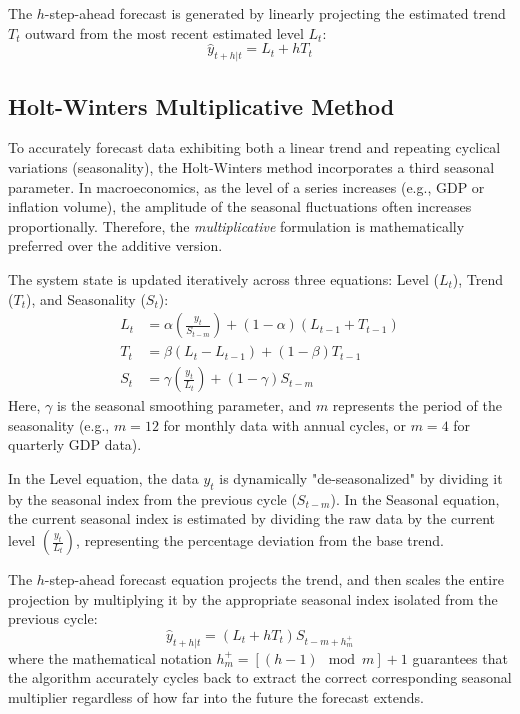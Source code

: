 \documentclass[11pt, a4paper]{report}
\begin{document}
The $h$-step-ahead forecast is generated by linearly projecting the estimated trend $T_t$ outward from the most recent estimated level $L_t$:
\begin{equation}
    \hat{y}_{t+h|t} = L_t + h T_t
\end{equation}

\subsection{Holt-Winters Multiplicative Method}
To accurately forecast data exhibiting both a linear trend and repeating cyclical variations (seasonality), the Holt-Winters method incorporates a third seasonal parameter. In macroeconomics, as the level of a series increases (e.g., GDP or inflation volume), the amplitude of the seasonal fluctuations often increases proportionally. Therefore, the \textit{multiplicative} formulation is mathematically preferred over the additive version.

The system state is updated iteratively across three equations: Level ($L_t$), Trend ($T_t$), and Seasonality ($S_t$):
\begin{align}
    L_t &= \alpha \left(\frac{y_t}{S_{t-m}}\right) + (1 - \alpha)(L_{t-1} + T_{t-1}) \\
    T_t &= \beta (L_t - L_{t-1}) + (1 - \beta)T_{t-1} \\
    S_t &= \gamma \left(\frac{y_t}{L_t}\right) + (1 - \gamma)S_{t-m}
\end{align}
Here, $\gamma$ is the seasonal smoothing parameter, and $m$ represents the period of the seasonality (e.g., $m=12$ for monthly data with annual cycles, or $m=4$ for quarterly GDP data). 

In the Level equation, the data $y_t$ is dynamically "de-seasonalized" by dividing it by the seasonal index from the previous cycle ($S_{t-m}$). In the Seasonal equation, the current seasonal index is estimated by dividing the raw data by the current level $\left(\frac{y_t}{L_t}\right)$, representing the percentage deviation from the base trend.

The $h$-step-ahead forecast equation projects the trend, and then scales the entire projection by multiplying it by the appropriate seasonal index isolated from the previous cycle:
\begin{equation}
    \hat{y}_{t+h|t} = (L_t + h T_t) S_{t-m+h_m^+}
\end{equation}
where the mathematical notation $h_m^+ = [(h-1) \mod m] + 1$ guarantees that the algorithm accurately cycles back to extract the correct corresponding seasonal multiplier regardless of how far into the future the forecast extends.
\end{document}
